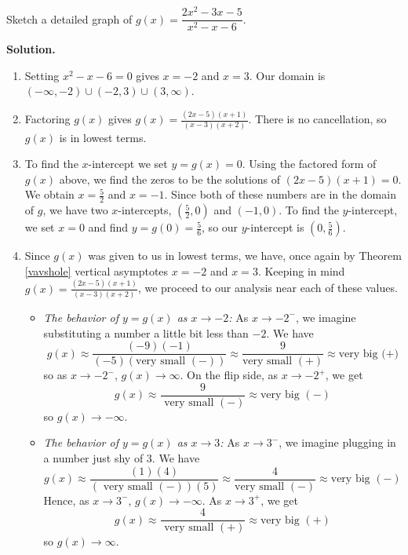 \begin{ex}  Sketch a detailed graph of $g(x) = \dfrac{2x^2-3x-5}{x^2-x-6}$.

{\bf Solution.}

\begin{enumerate}

\item  Setting $x^2-x-6 = 0$ gives $x = -2$ and $x=3$.  Our domain is $(-\infty, -2) \cup (-2,3) \cup (3,\infty)$.

\item  Factoring $g(x)$ gives $g(x) = \frac{(2x-5)(x+1)}{(x-3)(x+2)}$.  There is no cancellation, so $g(x)$ is in lowest terms.

\item  To find the $x$-intercept  we set $y = g(x) = 0$.  Using the factored form of $g(x)$ above, we find the zeros to be the solutions of $(2x-5)(x+1)=0$.  We obtain $x = \frac{5}{2}$ and $x=-1$. Since both of these numbers are in the domain of $g$, we have two $x$-intercepts, $\left( \frac{5}{2},0\right)$ and $(-1,0)$.  To find the $y$-intercept, we set $x=0$ and find $y = g(0) = \frac{5}{6}$, so our $y$-intercept is $\left(0, \frac{5}{6}\right)$.

\item  Since $g(x)$ was given to us in lowest terms, we have, once again by Theorem \ref{vavshole} vertical asymptotes $x=-2$ and $x=3$.  Keeping in mind $g(x) = \frac{(2x-5)(x+1)}{(x-3)(x+2)}$, we proceed to our analysis near each of these values.

\begin{itemize}

\item  \textit{The behavior of $y=g(x)$ as $x \rightarrow -2$:}  As $x \rightarrow -2^{-}$, we imagine substituting a number a little bit less than $-2$. We have \[g(x) \approx \frac{(-9)(-1)}{(-5)(\mbox{very small $(-)$})} \approx \frac{9}{\mbox{very small $(+)$}} \approx \mbox{very big (+)}\] so as $x \rightarrow -2^{-}$, $g(x) \rightarrow \infty$. On the flip side, as $x \rightarrow -2^{+}$, we get \[g(x) \approx \frac{9}{\mbox{ very small $(-)$}} \approx \mbox{very big $(-)$}\] so $g(x) \rightarrow -\infty$.

\item  \textit{The behavior of $y=g(x)$ as $x \rightarrow 3$:}  As $x \rightarrow 3^{-}$, we imagine plugging in a number just shy  of $3$. We have \[g(x) \approx \frac{(1)(4)}{(\mbox{ very small $(-)$}) (5)} \approx \frac{4}{\mbox{very small $(-)$}} \approx \mbox{very big $(-)$}\] Hence, as $x \rightarrow 3^{-}$, $g(x) \rightarrow -\infty$. As $x \rightarrow 3^{+}$, we get \[g(x) \approx \frac{4}{\mbox{ very small $(+)$}} \approx \mbox{very big $(+)$}\] so $g(x) \rightarrow \infty$.


\end{itemize}
\end{enumerate}
\end{ex}
